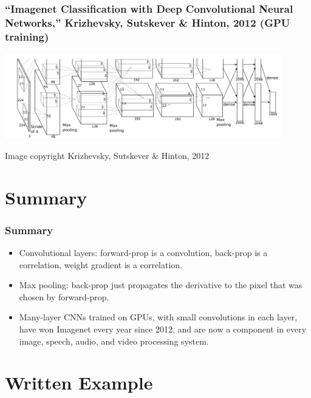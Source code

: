 \documentclass{beamer}
\begin{document}
\begin{frame}
  \frametitle{``Imagenet Classification with Deep Convolutional Neural
    Networks,'' Krizhevsky, Sutskever \& Hinton, 2012 (GPU training)}
  \centerline{\includegraphics[width=4.75in]{figs/krizhevsky2012.png}}
  \begin{tiny}Image copyright Krizhevsky, Sutskever \& Hinton, 2012\end{tiny}
\end{frame}


\section{Summary}
\setcounter{subsection}{1}

\begin{frame}
  \frametitle{Summary}
  \begin{itemize}
  \item Convolutional layers: forward-prop is a convolution, back-prop
    is a correlation, weight gradient is a correlation.
  \item Max pooling: back-prop just propagates the derivative to the
    pixel that was chosen by forward-prop.
  \item Many-layer CNNs trained on GPUs, with small convolutions in
    each layer, have won Imagenet every year since 2012, and are now a
    component in every image, speech, audio, and video processing
    system.
  \end{itemize}
\end{frame}

\section[Example]{Written Example}
\setcounter{subsection}{1}
\end{document}
